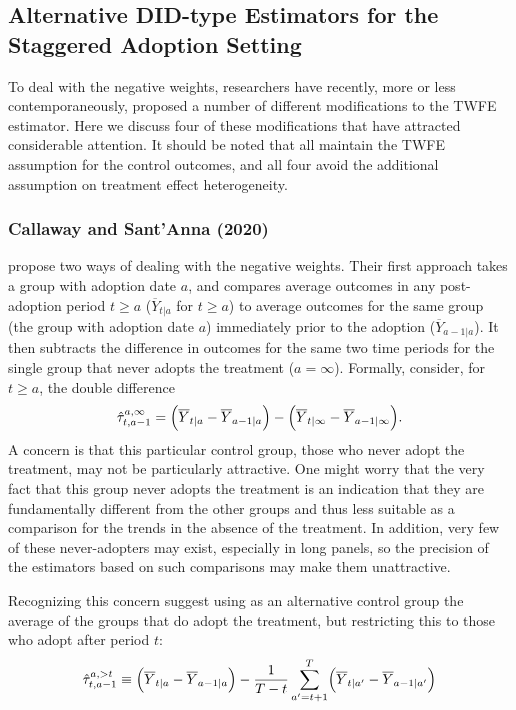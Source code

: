 \documentclass[letterpaper,12pt,leqno]{article}
\begin{document}
\subsection{Alternative DID-type Estimators for the Staggered Adoption Setting}

To deal with the negative weights, researchers have recently, more or less contemporaneously, proposed a number of different modifications to the TWFE estimator. Here we discuss four of these modifications that have attracted considerable attention. It should be noted that all maintain the TWFE assumption for the control outcomes, and all four avoid the additional assumption on treatment effect heterogeneity.

\subsubsection{Callaway and Sant'Anna (2020)}

\citep{callaway2020difference}
propose two ways of dealing with the negative weights. Their first approach takes a group with adoption date $a$, and compares average outcomes in any post-adoption period $t\geq a $  ($\overline{Y}_{t|a}$ for $t\geq a$) to average outcomes for the same group (the group with adoption date $a$) immediately prior to the adoption ($\overline{Y}_{a-1|a}$). It then subtracts the difference in outcomes for the same two time periods for the single group that never adopts the treatment ($a = \infty$).
Formally, consider, for $t\geq a$, the double difference
\begin{equation}\label{calla}\hat\tau_{t,a-1}^{a,\infty}= \Bigl(\overline{Y}_{t|a}-\overline{Y}_{a-1|a}\Bigr)
-\Bigl(\overline{Y}_{t|\infty}-\overline{Y}_{a-1|\infty}\Bigr).\end{equation}
A concern is that this particular control group, those who never adopt the treatment, may not be particularly attractive. One might worry that the very fact that this group never adopts the treatment is an indication that they are fundamentally different from the other groups and thus less suitable as a comparison for the trends in the absence of the treatment.
In addition, very few of these never-adopters may exist, especially in long panels, so the precision of the estimators based on such comparisons may make them unattractive.

Recognizing this concern \citep{callaway2020difference} suggest 
using as an alternative control group the average of the groups that do adopt the treatment, but restricting this to those who adopt after period $t$:
\[\hat\tau_{t,a-1}^{a,>t}\equiv \Bigl(\overline{Y}_{t|a}-\overline{Y}_{a-1|a}\Bigr)
-\frac{1}{T-t}\sum_{a'=t+1}^T\Bigl(\overline{Y}_{t|a'}-\overline{Y}_{a-1|a'}\Bigr)\]
\end{document}
